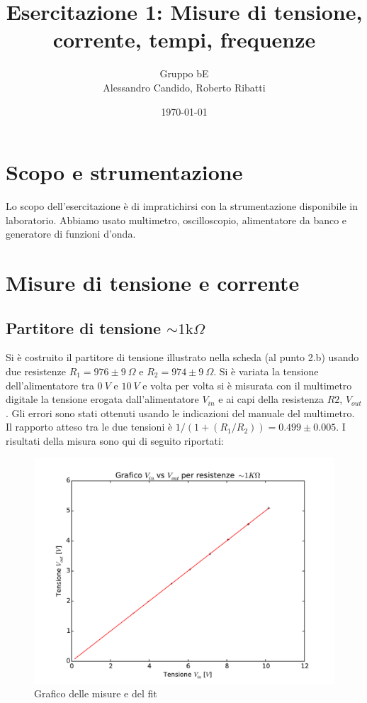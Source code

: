 \documentclass[10pt,a4paper]{article}
\title{Esercitazione 1: Misure di tensione, corrente, tempi, frequenze}
\author{Gruppo bE \\ Alessandro Candido, Roberto Ribatti}
\date{\today}
\newcommand\ohm{\Omega}
\newcommand\K{\text{k}}
\begin{document}
\maketitle

\section{Scopo e strumentazione}
Lo scopo dell'esercitazione è di impratichirsi con la strumentazione disponibile in laboratorio. Abbiamo usato multimetro, oscilloscopio, alimentatore da banco e generatore di funzioni d'onda.

\section{Misure di tensione e corrente}

\subsection{Partitore di tensione $\sim1 \K \ohm$}
Si è costruito il partitore di tensione illustrato nella scheda (al punto 2.b) usando due resistenze $R_1 = 976 \pm 9~\ohm$ e $R_2 = 974 \pm 9 ~\ohm$.
Si è variata la tensione dell'alimentatore tra $0~V$ e $10~V$ e volta per volta si è misurata con il multimetro digitale la tensione erogata dall'alimentatore $V_{in}$ e ai capi della resistenza $R2$, $V_{out}$. Gli errori sono stati ottenuti usando le indicazioni del manuale del multimetro.
Il rapporto atteso tra le due tensioni è $1/(1+(R_1/R_2))=0.499 \pm 0.005$. 
I risultati della misura sono qui di seguito riportati:

\begin{figure}[h]
\centering
	\begin{minipage}[h]{0.35\textwidth}
	\centering
	
	\end{minipage}%
	\begin{minipage}[h]{0.65\textwidth}
	\centering
	\includegraphics[width=1\textwidth]{../grafici/fit_1KOhm.pdf}
	\caption{Grafico delle misure e del fit}
	\end{minipage}
\end{figure}
\end{document}
